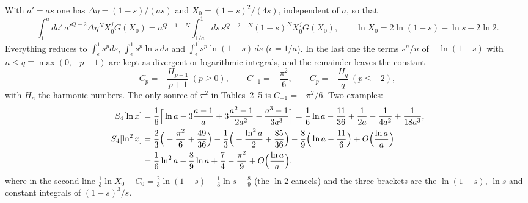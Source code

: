 \documentclass[aps,prd,onecolumn,10pt,nofootinbib,floatfix]{revtex4-2}
\begin{document}
With $a'=as$ one has $\Delta\eta=(1-s)/(as)$ and $X_0=(1-s)^2/(4s)$, independent of $a$, so that
\begin{equation}
\int_1^a\!da'\,a'^{Q-2}\Delta\eta^NX_0^jG(X_0)=a^{Q-1-N}\int_{1/a}^1\!ds\,s^{Q-2-N}(1-s)^NX_0^jG(X_0),\qquad
\ln X_0=2\ln(1-s)-\ln s-2\ln2 .
\label{eq:s6:scaling}
\end{equation}
Everything reduces to $\int_\epsilon^1s^pds$, $\int_\epsilon^1s^p\ln s\,ds$ and $\int_\epsilon^1s^p\ln(1-s)\,ds$
($\epsilon=1/a$). In the last one the terms $s^n/n$ of $-\ln(1-s)$ with $n\le q\equiv\max(0,-p-1)$ are kept as
divergent or logarithmic integrals, and the remainder leaves the constant
\begin{equation}
C_p=-\frac{H_{p+1}}{p+1}\ (p\ge0),\qquad C_{-1}=-\frac{\pi^2}{6},\qquad C_p=-\frac{H_q}{q}\ (p\le-2),
\label{eq:s6:Cp}
\end{equation}
with $H_n$ the harmonic numbers. The only source of $\pi^2$ in Tables~2--5 is $C_{-1}=-\pi^2/6$. Two examples:
\begin{equation}
\begin{aligned}
S_4[\ln x]&=\frac16\Big[\ln a-3\frac{a-1}a+3\frac{a^2-1}{2a^2}-\frac{a^3-1}{3a^3}\Big]
=\frac16\ln a-\frac{11}{36}+\frac1{2a}-\frac1{4a^2}+\frac1{18a^3},\\
S_4[\ln^2x]&=\frac23\Big(-\frac{\pi^2}6+\frac{49}{36}\Big)-\frac13\Big(-\frac{\ln^2a}2+\frac{85}{36}\Big)
-\frac89\Big(\ln a-\frac{11}6\Big)+O\Big(\frac{\ln a}{a}\Big)\\
&=\frac16\ln^2a-\frac89\ln a+\frac74-\frac{\pi^2}9+O\Big(\frac{\ln a}{a}\Big),
\end{aligned}
\label{eq:s6:examples}
\end{equation}
where in the second line $\frac13\ln X_0+C_0=\frac23\ln(1-s)-\frac13\ln s-\frac89$ (the $\ln2$ cancels) and the three
brackets are the $\ln(1-s)$, $\ln s$ and constant integrals of $(1-s)^3/s$.
\end{document}
